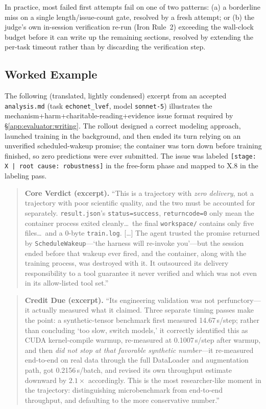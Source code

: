 In practice, most failed first attempts fail on one of two patterns: (a)
a borderline miss on a single length/issue-count gate, resolved by a
fresh attempt; or (b) the judge's own in-session verification re-run
(Iron Rule~2) exceeding the wall-clock budget before it can write up the
remaining sections, resolved by extending the per-task timeout rather
than by discarding the verification step.

\subsection{Worked Example}
\label{app:evaluator:example}

The following (translated, lightly condensed) excerpt from an accepted
\texttt{analysis.md} (task \texttt{echonet\_lvef}, model \texttt{sonnet-5})
illustrates the mechanism+harm+charitable-reading+evidence issue format
required by \S\ref{app:evaluator:writing}. The rollout designed a correct
modeling approach, launched training in the background, and then ended its
turn relying on an unverified scheduled-wakeup promise; the container was
torn down before training finished, so zero predictions were ever
submitted. The issue was labeled \texttt{[stage: X | root cause:
robustness]} in the free-form phase and mapped to X.8 in the labeling pass.

\begin{quote}\small
\textbf{Core Verdict (excerpt).} ``This is a trajectory with \emph{zero
delivery}, not a trajectory with poor scientific quality, and the two
must be accounted for separately. \texttt{result.json}'s
\texttt{status=success}, \texttt{returncode=0} only mean the container
process exited cleanly\ldots\ the final \texttt{workspace/} contains only
five files\ldots\ and a 0-byte \texttt{train.log}. [\ldots] The agent
trusted the promise returned by \texttt{ScheduleWakeup}---`the harness
will re-invoke you'---but the session ended before that wakeup ever fired,
and the container, along with the training process, was destroyed with it.
It outsourced its delivery responsibility to a tool guarantee it never
verified and which was not even in its allow-listed tool set.''
\end{quote}

\begin{quote}\small
\textbf{Credit Due (excerpt).} ``Its engineering validation was not
perfunctory---it actually measured what it claimed. Three separate
timing passes make the point: a synthetic-tensor benchmark first measured
14.67\,s/step; rather than concluding `too slow, switch models,' it
correctly identified this as CUDA kernel-compile warmup, re-measured at
0.1007\,s/step after warmup, and then \emph{did not stop at that
favorable synthetic number}---it re-measured end-to-end on real data
through the full DataLoader and augmentation path, got 0.2156\,s/batch,
and revised its own throughput estimate downward by $2.1\times$
accordingly. This is the most researcher-like moment in the trajectory:
distinguishing microbenchmark from end-to-end throughput, and defaulting
to the more conservative number.''
\end{quote}

